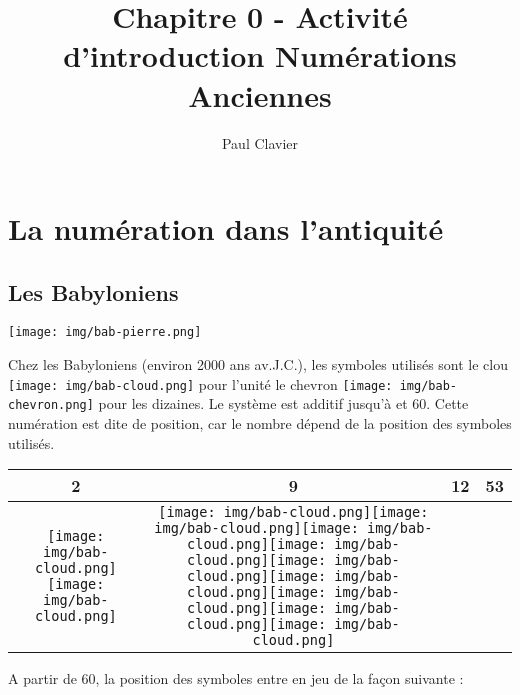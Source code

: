 \documentclass[12pt,a4paper]{article}
\author{Paul Clavier}
\title{Chapitre 0 - Activité d'introduction Numérations Anciennes}
\begin{document}
\renewcommand\thesection{\Roman{section}}
\renewcommand\thesubsection{\arabic{subsection}}


\ifdefined\isprof
	\TeacherModeOn
\fi



\newcommand{\clou}{\texttt{[image: img/bab-cloud.png]}}
\newcommand{\chevron}{\texttt{[image: img/bab-chevron.png]}}


\begin{center}
\end{center}

\section{La numération dans l'antiquité}
\subsection{Les Babyloniens}

\begin{minipage}{0.2\textwidth}
\texttt{[image: img/bab-pierre.png]} 
\end{minipage}
\begin{minipage}{0.8\textwidth}

Chez les Babyloniens (environ 2000 ans av.J.C.), les symboles utilisés sont le clou \texttt{[image: img/bab-cloud.png]} pour l’unité le chevron \texttt{[image: img/bab-chevron.png]} pour les dizaines. Le système est additif jusqu’à et 60. 
Cette numération est dite de position, car le nombre dépend de la position des symboles utilisés.
\begin{center}
\begin{tabular}{|c|c|c|c|}
\hline
2 & 9 & 12 & 53 \\ \hline
\clou\clou & \clou\clou\clou\clou\clou\clou\clou\clou\clou & \thead{\chevron\clou\clou} & \thead{\chevron\chevron\clou\clou\clou}
\\ \hline
\end{tabular}
\end{center}
A partir de 60, la position des symboles entre en jeu de la façon suivante : 
\end{minipage}
\end{document}
